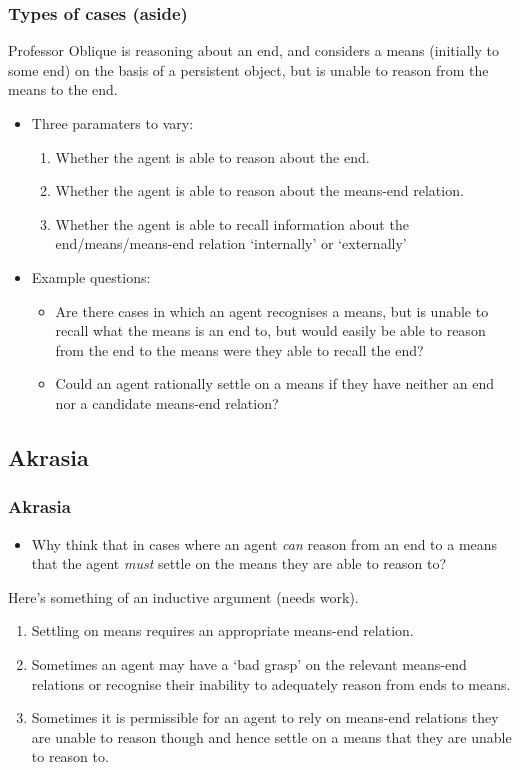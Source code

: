 \documentclass[noamssymb,
]{beamer} %
\newcommand{\hand}{\ding{43}}
\begin{document}
\begin{frame}
  \frametitle{Types of cases (aside)}

  Professor Oblique is reasoning about an end, and considers a means (initially to some end) on the basis of a persistent object, but is unable to reason from the means to the end.
  \begin{itemize}
  \item Three paramaters to vary:
    \begin{enumerate}
    \item Whether the agent is able to reason about the end.
    \item Whether the agent is able to reason about the means-end relation.
    \item Whether the agent is able to recall information about the end/means/means-end relation `internally' or `externally'
    \end{enumerate}
  \item Example questions:
    \begin{itemize}
    \item Are there cases in which an agent recognises a means, but is unable to recall what the means is an end to, but would easily be able to reason from the end to the means were they able to recall the end?
    \item Could an agent rationally settle on a means if they have neither an end nor a candidate means-end relation?
    \end{itemize}
  \end{itemize}
\end{frame}



\subsection{Akrasia}
\label{sec:akrasia}

\begin{frame}
  \frametitle{Akrasia}

  \begin{itemize}
  \item[\hand] Why think that in cases where an agent \emph{can} reason from an end to a means that the agent \emph{must} settle on the means they are able to reason to?
  \end{itemize}

  Here's something of an inductive argument (needs work).

\begin{enumerate}
\item Settling on means requires an appropriate means-end relation.
\item Sometimes an agent may have a `bad grasp' on the relevant means-end relations or recognise their inability to adequately reason from ends to means.
\item Sometimes it is permissible for an agent to rely on means-end relations they are unable to reason though and hence settle on a means that they are unable to reason to.
\end{enumerate}
\end{frame}
\end{document}
